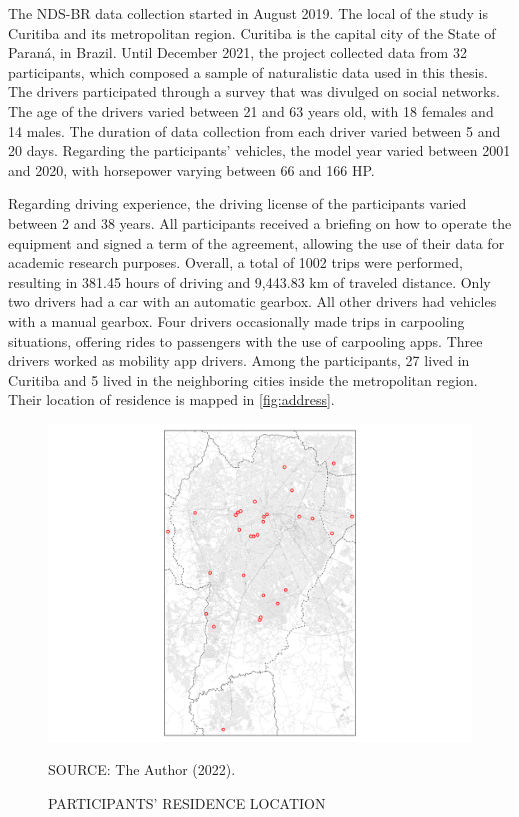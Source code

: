 The NDS-BR data collection started in August 2019. The local of the study is Curitiba and its metropolitan region. Curitiba is the capital city of the State of Paraná, in Brazil. Until December 2021, the project collected data from 32 participants, which composed a sample of naturalistic data used in this thesis. The drivers participated through a survey that was divulged on social networks. The age of the drivers varied between 21 and 63 years old, with 18 females and 14 males. The duration of data collection from each driver varied between 5 and 20 days. Regarding the participants' vehicles, the model year varied between 2001 and 2020, with horsepower varying between 66 and 166 HP. 

Regarding driving experience, the driving license of the participants varied between 2 and 38 years. All participants received a briefing on how to operate the equipment and signed a term of the agreement, allowing the use of their data for academic research purposes. Overall, a total of 1002 trips were performed, resulting in 381.45 hours of driving and 9,443.83 km of traveled distance. Only two drivers had a car with an automatic gearbox. All other drivers had vehicles with a manual gearbox. Four drivers occasionally made trips in carpooling situations, offering rides to passengers with the use of carpooling apps. Three drivers worked as mobility app drivers. Among the participants, 27 lived in Curitiba and 5 lived in the neighboring cities inside the metropolitan region. Their location of residence is mapped in \autoref{fig:address}. 

\begin{figure}[!htbp]
    \centering\footnotesize
    \captionsetup{font=footnotesize}
    \caption{PARTICIPANTS' RESIDENCE LOCATION}
    \includegraphics{fig/address_map.png}
    \label{fig:address}
    \par SOURCE: The Author (2022).
\end{figure}

